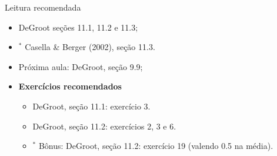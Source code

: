 \begin{frame}{Leitura recomendada}
\begin{itemize}
 \item[\faBook] DeGroot seções 11.1, 11.2 e 11.3;
 \item[\faBook] $^\ast$ Casella \& Berger (2002), seção 11.3.
 \item[\faForward] Próxima aula: DeGroot, seção 9.9;
 \item {\large\textbf{Exercícios recomendados}}
  \begin{itemize}
   \item[\faBookmark] DeGroot, seção 11.1: exercício 3.
   \item[\faBookmark] DeGroot, seção 11.2: exercícios 2, 3 e 6.
   \item[\faBookmark] $^\ast$ Bônus: DeGroot, seção 11.2: exercício  19 (valendo 0.5 na média).
  \end{itemize}
 \end{itemize} 
\end{frame}
